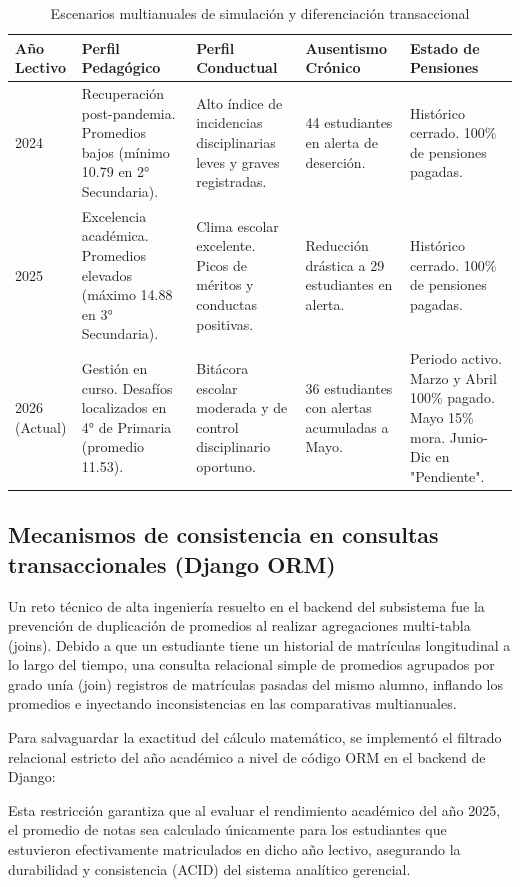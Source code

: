 \documentclass[12pt,a4paper,oneside]{report}
\begin{document}
\begin{table}[H]
\centering
\caption{Escenarios multianuales de simulación y diferenciación transaccional}
\label{tab:escenarios_simulacion}
\begin{tabularx}{\textwidth}{lXXp{2.2cm}p{3cm}}
\toprule
\textbf{Año Lectivo} & \textbf{Perfil Pedagógico} & \textbf{Perfil Conductual} & \textbf{Ausentismo Crónico} & \textbf{Estado de Pensiones} \\
\midrule
2024 & Recuperación post-pandemia. Promedios bajos (mínimo 10.79 en 2° Secundaria). & Alto índice de incidencias disciplinarias leves y graves registradas. & 44 estudiantes en alerta de deserción. & Histórico cerrado. 100\% de pensiones pagadas. \\
2025 & Excelencia académica. Promedios elevados (máximo 14.88 en 3° Secundaria). & Clima escolar excelente. Picos de méritos y conductas positivas. & Reducción drástica a 29 estudiantes en alerta. & Histórico cerrado. 100\% de pensiones pagadas. \\
2026 (Actual) & Gestión en curso. Desafíos localizados en 4° de Primaria (promedio 11.53). & Bitácora escolar moderada y de control disciplinario oportuno. & 36 estudiantes con alertas acumuladas a Mayo. & Periodo activo. Marzo y Abril 100\% pagado. Mayo 15\% mora. Junio-Dic en "Pendiente". \\
\bottomrule
\end{tabularx}
\end{table}

\subsection{Mecanismos de consistencia en consultas transaccionales (Django ORM)}
Un reto técnico de alta ingeniería resuelto en el backend del subsistema fue la prevención de duplicación de promedios al realizar agregaciones multi-tabla (joins). Debido a que un estudiante tiene un historial de matrículas longitudinal a lo largo del tiempo, una consulta relacional simple de promedios agrupados por grado unía (join) registros de matrículas pasadas del mismo alumno, inflando los promedios e inyectando inconsistencias en las comparativas multianuales. 

Para salvaguardar la exactitud del cálculo matemático, se implementó el filtrado relacional estricto del año académico a nivel de código ORM en el backend de Django:



Esta restricción garantiza que al evaluar el rendimiento académico del año 2025, el promedio de notas sea calculado únicamente para los estudiantes que estuvieron efectivamente matriculados en dicho año lectivo, asegurando la durabilidad y consistencia (ACID) del sistema analítico gerencial.
\end{document}
